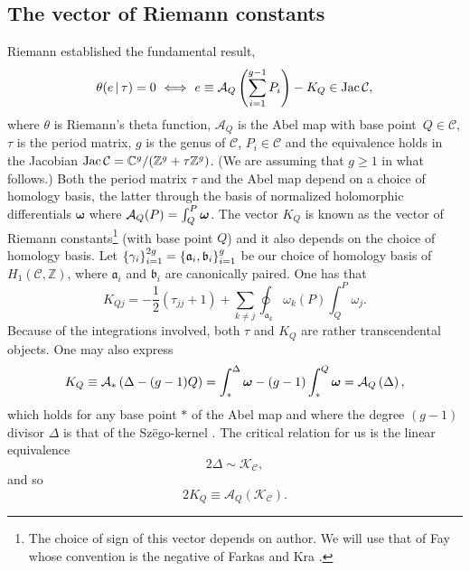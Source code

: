 \documentclass[pdftex]{sigma}
\numberwithin{equation}{section}
\def\Jac{\mathop{\rm Jac}\nolimits}
\begin{document}
\subsection{The vector of Riemann constants}\label{section5.1}
Riemann established the fundamental result,
\[
\theta(e\,|\,\tau)=0 \ \Longleftrightarrow \
e\equiv
\mathcal{A}_Q\left(\sum_{i=1}\sp{g-1}P_i\right)-K_Q\in\Jac{\mathcal{C}},
\]
where $\theta$ is Riemann's theta function, $\mathcal{A}_Q$ is the
Abel map with base point~$Q\in\mathcal{C}$, $\tau$ is the period
matrix, $g$ is the genus of $\mathcal{C}$, $P_i\in\mathcal{C}$ and
the equivalence holds in the Jacobian
$\Jac\mathcal{C}=\mathbb{C}\sp{g}/(\mathbb{Z}\sp{g}+\tau\mathbb{Z}\sp{g})$.
(We are assuming that $g\ge1$ in what follows.) Both the period matrix $\tau$
and the Abel map depend on a choice of homology basis, the latter
through the basis of normalized holomorphic dif\/ferentials
$\boldsymbol{\omega}$ where
$\mathcal{A}_Q(P)=\int_Q\sp{P}\boldsymbol{\omega}$. The vector
$K_Q$ is known as the vector of Riemann constants\footnote{The
choice of sign of this vector depends on author. We will use that
of Fay \cite{fay} whose convention is the negative of Farkas and Kra \cite{farkaskra}.} (with
base point $Q$) and it also depends on the choice of homology
basis. Let ${\left\{\gamma_i\right\}_{i=1}\sp{2g}}=
\left\{\mathfrak{a}_i,\mathfrak{b}_i\right\}_{i=1}\sp{g}$ be our
choice of homology basis of $H_1(\mathcal{C},\mathbb{Z})$, where $
\mathfrak{a}_i$ and $\mathfrak{b}_i$ are canonically paired. One has that
\[
K_{Q j}  = -\frac{1}{2}\left( \tau_{jj} + 1\right) +
    \sum_{k\ne j}\oint_{\mathbf{\mathfrak{a}}_{k}}
    \omega_{k}(P)\int^{P}_{Q}\omega_{j}.
\]
Because of the integrations involved, both
$\tau$ and $K_Q$ are rather transcendental objects. One may also
express
\begin{equation}\label{vrcdelta}
K_Q\equiv\mathcal{A}_\ast\left(\Delta-(g-1)Q\right)
=\int_\ast\sp{\Delta}{\boldsymbol{\omega}}-(g-1)\int_\ast\sp{Q}{\boldsymbol{\omega}}
=\mathcal{A}_Q\left(\Delta\right),
\end{equation}
which holds for any base point $\ast$ of the Abel map and where
the degree $(g-1)$ divisor $\Delta$ is that of the Sz\"ego-kernel \cite{fay}. The
critical relation for us is the linear equivalence
\begin{equation*}\label{deltacanonical}
2\Delta\sim
    \mathcal{K}_\mathcal{C},
\end{equation*}
and so
\begin{equation}\label{Kcanonical}
2K_Q\equiv\mathcal{A}_Q(\mathcal{K}_\mathcal{C}).
\end{equation}
\end{document}
